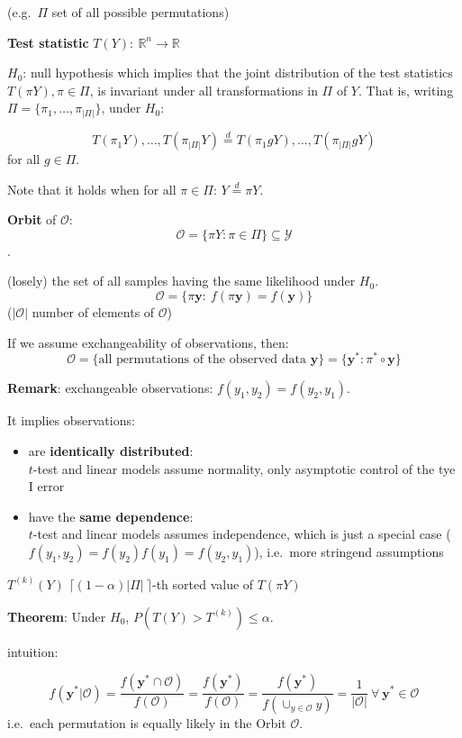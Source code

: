 \documentclass[
]{article}
\providecommand{\tightlist}{%
  \setlength{\itemsep}{0pt}\setlength{\parskip}{0pt}}
\begin{document}
(e.g.~\(\Pi\) set of all possible permutations)

\textbf{Test statistic} \(T(Y):\ \mathbb{R}^n\to\mathbb{R}\)

\(H_0\): null hypothesis which implies that the joint distribution of
the test statistics \(T(\pi Y), \pi \in \Pi\), is invariant under all
transformations in \(\Pi\) of \(Y\). That is, writing
\(\Pi = \{\pi_1,\ldots, \pi_{|\Pi|}\}\), under \(H_0\):

\[T(\pi_1 Y), \ldots, T(\pi_{|\Pi|}Y) \overset{d}{=} T(\pi_1g Y), \ldots, T(\pi_{|\Pi|}gY)\]
for all \(g \in \Pi\).

Note that it holds when for all \(\pi \in \Pi\):
\(Y \overset{d}{=}\pi Y\).

\textbf{Orbit} of \(\mathcal{O}\):
\[\mathcal{O}=\{\pi Y : \pi \in \Pi\} \subseteq \mathcal{Y}\].

(losely) the set of all samples having the same likelihood under
\(H_0\).\\
\[\mathcal{O}=\{\pi \mathbf{y}:\ f(\pi \mathbf{y})=f(\mathbf{y}) \}\]
(\(|\mathcal{O}|\) number of elements of \(\mathcal{O}\))

If we assume exchangeability of observations, then:
\[\mathcal{O}=\{\textrm{all permutations of the observed data }\mathbf{y}\} = \{\mathbf{y}^*:\pi^*\circ\mathbf{y}\}\]

\textbf{Remark}: exchangeable observations: \(f(y_1,y_2)=f(y_2,y_1)\).

It implies observations:

\begin{itemize}
\tightlist
\item
  are \textbf{identically distributed}:\\
  \(t\)-test and linear models assume normality, only asymptotic control
  of the tye I error\\
\item
  have the \textbf{same dependence}:\\
  \(t\)-test and linear models assumes independence, which is just a
  special case (\(f(y_1,y_2)=f(y_2)f(y_1)=f(y_2,y_1)\)), i.e.~more
  stringend assumptions
\end{itemize}

\(T^{(k)}(Y)\) \(\lceil(1-\alpha)|\Pi|\ \rceil\)-th sorted value of
\(T(\pi Y)\)

\textbf{Theorem}: Under \(H_0\), \(P(T(Y) > T^{(k)}) \leq \alpha\).

intuition:

\[f(\mathbf{y}^*|\mathcal{O})=\frac{f(\mathbf{y}^*\cap\mathcal{O})}{f(\mathcal{O})}=
\frac{f(\mathbf{y}^*)}{f(\mathcal{O})}=
\frac{f(\mathbf{y}^*)}{f(\cup_{y\in\mathcal{O}}y)}=\frac{1}{|\mathcal{O}|}\ \forall\ \mathbf{y}^*\in \mathcal{O}\]
i.e.~each permutation is equally likely in the Orbit \(\mathcal{O}\).
\end{document}
